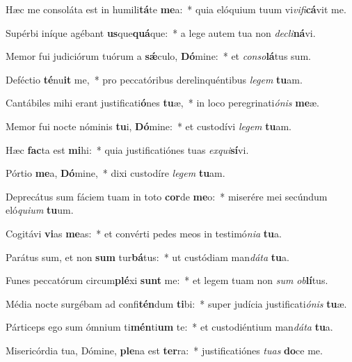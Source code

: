 \item Hæc me consoláta est in humili\textbf{tá}te \textbf{me}a:~* quia elóquium tuum vi\textit{vi}\textit{fi}\textbf{cá}vit me.
\item Supérbi iníque agébant \textbf{us}que\textbf{quá}que:~* a lege autem tua non \textit{de}\textit{cli}\textbf{ná}vi.
\item Memor fui judiciórum tuórum a \textbf{sǽ}culo, \textbf{Dó}mine:~* et \textit{con}\textit{so}\textbf{lá}tus sum.
\item Deféctio \textbf{té}nu\textbf{it} me,~* pro peccatóribus derelinquéntibus \textit{le}\textit{gem} \textbf{tu}am.
\item Cantábiles mihi erant justificati\textbf{ó}nes \textbf{tu}æ,~* in loco peregrinati\textit{ó}\textit{nis} \textbf{me}æ.
\item Memor fui nocte nóminis \textbf{tu}i, \textbf{Dó}mine:~* et custodívi \textit{le}\textit{gem} \textbf{tu}am.
\item Hæc \textbf{fac}ta est \textbf{mi}hi:~* quia justificatiónes tuas \textit{ex}\textit{qui}\textbf{sí}vi.
\item Pórtio \textbf{me}a, \textbf{Dó}mine,~* dixi custodíre \textit{le}\textit{gem} \textbf{tu}am.
\item Deprecátus sum fáciem tuam in toto \textbf{cor}de \textbf{me}o:~* miserére mei secúndum eló\textit{qui}\textit{um} \textbf{tu}um.
\item Cogitávi \textbf{vi}as \textbf{me}as:~* et convérti pedes meos in testimó\textit{ni}\textit{a} \textbf{tu}a.
\item Parátus sum, et non \textbf{sum} tur\textbf{bá}tus:~* ut custódiam man\textit{dá}\textit{ta} \textbf{tu}a.
\item Funes peccatórum circum\textbf{plé}xi \textbf{sunt} me:~* et legem tuam non \textit{sum} \textit{ob}\textbf{lí}tus.
\item Média nocte surgébam ad confi\textbf{tén}dum \textbf{ti}bi:~* super judícia justificati\textit{ó}\textit{nis} \textbf{tu}æ.
\item Párticeps ego sum ómnium ti\textbf{mén}ti\textbf{um} te:~* et custodiéntium man\textit{dá}\textit{ta} \textbf{tu}a.
\item Misericórdia tua, Dómine, \textbf{ple}na est \textbf{ter}ra:~* justificatiónes \textit{tu}\textit{as} \textbf{do}ce me.
